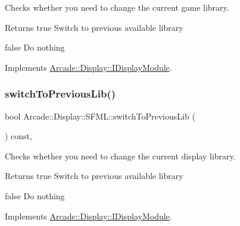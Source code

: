 Checks whether you need to change the current game library. 

\begin{DoxyReturn}{Returns}
true Switch to previous available library 

false Do nothing 
\end{DoxyReturn}


Implements \mbox{\hyperlink{classArcade_1_1Display_1_1IDisplayModule_a3bbbfe00907c8f3e4c7ef1aadedcc513}{Arcade\+::\+Display\+::\+I\+Display\+Module}}.

\mbox{\label{classArcade_1_1Display_1_1SFML_ae77df516bddc7ed5a4c0acdcf2443225}} 
\subsubsection{\texorpdfstring{switchToPreviousLib()}{switchToPreviousLib()}}
{\footnotesize\ttfamily bool Arcade\+::\+Display\+::\+S\+F\+M\+L\+::switch\+To\+Previous\+Lib (\begin{DoxyParamCaption}{ }\end{DoxyParamCaption}) const\hspace{0.3cm}{\ttfamily [final]}, {\ttfamily [virtual]}}



Checks whether you need to change the current display library. 

\begin{DoxyReturn}{Returns}
true Switch to previous available library 

false Do nothing 
\end{DoxyReturn}


Implements \mbox{\hyperlink{classArcade_1_1Display_1_1IDisplayModule_a498d51597164e9f92e97ec2afee426b0}{Arcade\+::\+Display\+::\+I\+Display\+Module}}.

